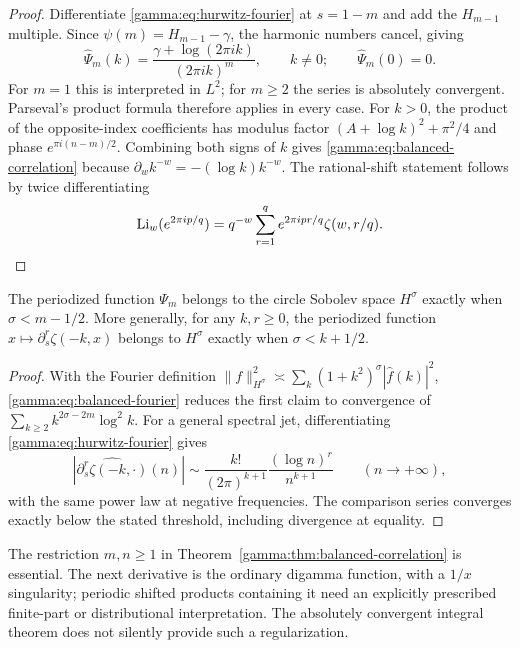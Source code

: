 \begin{proof}
Differentiate \eqref{gamma:eq:hurwitz-fourier} at $s=1-m$ and add the
$H_{m-1}$ multiple. Since
$\psi(m)=H_{m-1}-\gamma$, the harmonic numbers cancel, giving
\begin{equation}
 \widehat\Psi_m(k)
 =\frac{\gamma+\log(2\pi ik)}{(2\pi ik)^m},
 \qquad k\ne0;\qquad \widehat\Psi_m(0)=0.
 \label{gamma:eq:balanced-fourier}
\end{equation}
For $m=1$ this is interpreted in $L^2$; for $m\ge2$ the series is
absolutely convergent. Parseval's product formula therefore applies
in every case. For $k>0$, the product of the opposite-index
coefficients has modulus factor
$(A+\log k)^2+\pi^2/4$ and phase $e^{\pi i(n-m)/2}$.
Combining both signs of $k$ gives
\eqref{gamma:eq:balanced-correlation} because
$\partial_w k^{-w}=-(\log k)k^{-w}$.
The rational-shift statement follows by twice differentiating
\[
 \operatorname{Li}_w(e^{2\pi ip/q})
    =q^{-w}\sum_{r=1}^q e^{2\pi ipr/q}\zeta(w,r/q).
\]
\end{proof}

\begin{corollary}
\label{gamma:cor:sobolev}
The periodized function $\Psi_m$ belongs to the circle Sobolev space
$H^\sigma$ exactly when $\sigma<m-1/2$. More generally, for any
$k,r\ge0$, the periodized function
$x\mapsto\partial_s^r\zeta(-k,x)$ belongs to $H^\sigma$ exactly when
$\sigma<k+1/2$.
\end{corollary}

\begin{proof}
With the Fourier definition
$\|f\|_{H^\sigma}^2\asymp\sum_k(1+k^2)^\sigma|\widehat f(k)|^2$,
\eqref{gamma:eq:balanced-fourier} reduces the first claim to convergence
of $\sum_{k\ge2}k^{2\sigma-2m}\log^2k$.
For a general spectral jet, differentiating
\eqref{gamma:eq:hurwitz-fourier} gives
\[
 |\widehat{\partial_s^r\zeta(-k,\cdot)}(n)|
 \sim\frac{k!}{(2\pi)^{k+1}}
              \frac{(\log n)^r}{n^{k+1}}\qquad(n\to+\infty),
\]
with the same power law at negative frequencies.
The comparison series converges exactly below the stated threshold,
including divergence at equality.
\end{proof}

\begin{remark}
\label{gamma:rem:boundary}
The restriction $m,n\ge1$ in
Theorem~\ref{gamma:thm:balanced-correlation} is essential. The next
derivative is the ordinary digamma function, with a $1/x$ singularity;
periodic shifted products containing it need an explicitly prescribed
finite-part or distributional interpretation. The absolutely
convergent integral theorem does not silently provide such a
regularization.
\end{remark}
